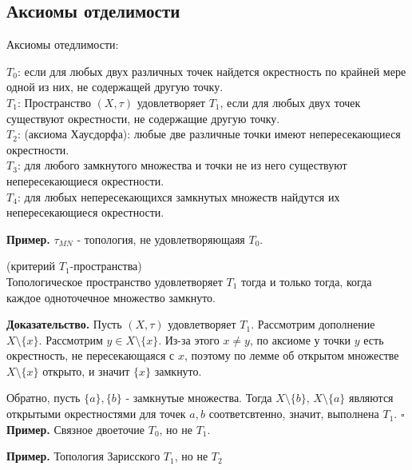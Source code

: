 \subsection{Аксиомы отделимости}
\begin{defin}
Аксиомы отедлимости:
\end{defin}
\textbf{$T_0$}: если для любых двух различных точек найдется окрестность 
по крайней 
мере одной из них, не содержащей другую точку.\\
\textbf{$T_1$}: Пространство $(X,\tau)$ удовлетворяет  $T_1$, если для 
любых двух
точек существуют окрестности, не содержащие другую точку.\\
\textbf{$T_2$}: (аксиома Хаусдорфа): любые две различные точки имеют 
непересекающиеся окрестности.\\
\textbf{$T_3$}: для любого замкнутого множества и точки не из него 
существуют непересекающиеся окрестности.\\
\textbf{$T_4$}: для любых непересекающихся замкнутых множеств найдутся их
непересекающиеся окрестности. 

\textbf{Пример.} $\tau_{MN}$ - топология, не удовлетворяющаяя  $T_0$.
\begin{theor}
    (критерий $T_1$-пространства)\\
    Топологическое пространство удовлетворяет $T_1$ тогда и только тогда,
    когда каждое одноточечное множество замкнуто.
\end{theor}
\textbf{Доказательство.} Пусть $(X,\tau)$ удовлетворяет  $T_1$. Рассмотрим 
дополнение $X\setminus \{x\}$. Рассмотрим $y\in X\setminus \{x\}$. 
Из-за этого $x\ne y$, по аксиоме у точки $y$ есть окрестность, не
пересекающаяся с $x$, поэтому по лемме об открытом множестве  
$X\setminus \{x\}$ открыто, и значит $\{x\}$ замкнуто. 

Обратно, пусть $\{a\},\{b\}$ - замкнутые множества. Тогда $X\setminus \{b\}$,
$X\setminus \{a\}$ являются открытыми окрестностями для точек $a,b$ 
соответсвтенно, значит, выполнена  $T_1$. $\square$ \\

\textbf{Пример.} Связное двоеточие $T_0$, но не  $T_1$. 

\textbf{Пример.} Топология Зарисского $T_1$, но не  $T_2$



